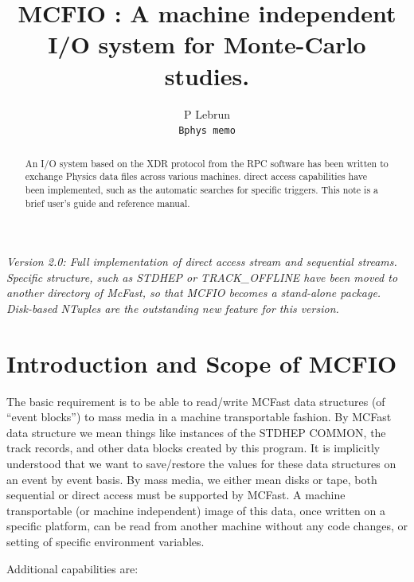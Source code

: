 
\pagestyle{plain}
\title{ MCFIO : A machine independent I/O system for Monte-Carlo studies.}
\author{P Lebrun \\
{\tt Bphys memo}}


\maketitle
 \begin{abstract}
An I/O system based on the XDR protocol from the RPC software has been
written to exchange Physics data files across various machines.
direct access capabilities have been implemented, such as the
automatic searches for specific triggers.  This note is a brief
user's guide and reference manual.
\end{abstract}

\vspace{.1in}
{\em Version 2.0: Full implementation of direct access stream and
sequential streams. Specific structure, such as STDHEP or TRACK\_OFFLINE
have been moved to another directory of McFast, so that MCFIO becomes
a stand-alone package. Disk-based NTuples are the outstanding new feature
for this version.}



\section{Introduction and Scope of MCFIO}

The basic requirement is to be able to read/write MCFast data
structures (of ``event blocks'')  to mass media in a machine transportable
fashion. By MCFast data structure we mean things like instances of the STDHEP
COMMON, the track records, and other data blocks created by this program.
It is implicitly understood that we want to save/restore the values for these
data structures on an event by event basis. By mass media, we either mean disks or
tape, both sequential or direct access must be supported by MCFast.
A machine transportable (or machine independent) image of this data,
once written on a specific platform, can be read from another machine
without any code changes, or setting of specific environment variables.

Additional capabilities are:

